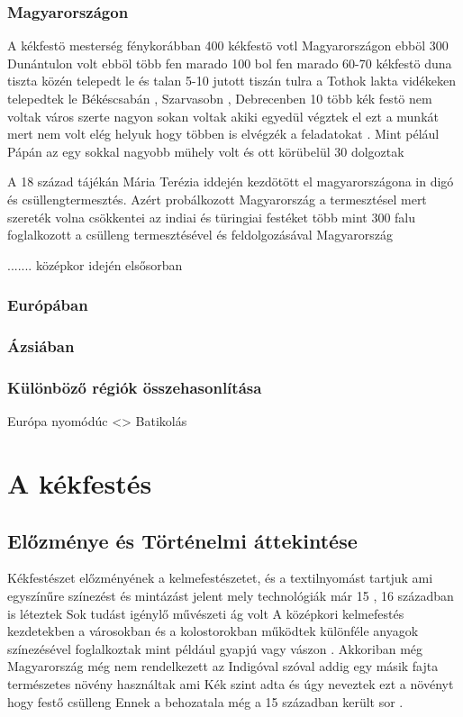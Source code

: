 \documentclass[fontsize=12pt, appendixprefix=true]{scrreprt}
\begin{document}
\subsection{Magyarországon}
A kékfestö mesterség fénykorábban 400 kékfestö votl Magyarországon ebböl 300 Dunántulon volt ebböl több fen marado 100 bol fen marado 60-70 kékfestö duna tiszta közén telepedt le és talan 5-10 jutott tiszán tulra a Tothok lakta vidékeken telepedtek  le Békéscsabán , Szarvasobn , Debrecenben 
10 több kék festö nem voltak város szerte 
nagyon sokan voltak akiki egyedül végztek el ezt a munkát mert nem volt elég helyuk hogy többen is elvégzék a feladatokat .
Mint pélául Pápán az egy sokkal nagyobb mühely volt és ott körübelül 30 dolgoztak 

A 18 század tájékán Mária Terézia iddején kezdötött el magyarországona in digó és csüllengtermesztés.
Azért probálkozott Magyarország a termesztésel mert szereték volna csökkentei az indiai és türingiai festéket
több mint 300 falu foglalkozott a csülleng termesztésével  és feldolgozásával 
Magyarország 
   
.......
középkor idején elsősorban 

\subsection{Európában}

\subsection{Ázsiában}

\subsection{Különböző régiók összehasonlítása}
   Európa nyomódúc <> Batikolás
\chapter{A kékfestés}
\section{Előzménye és Történelmi áttekintése}
Kékfestészet előzményének a kelmefestészetet, és a textilnyomást tartjuk ami egyszínűre színezést és mintázást jelent  mely technológiák már 15 , 16 században is léteztek 
Sok tudást igénylő művészeti ág volt
A középkori kelmefestés kezdetekben a városokban és a kolostorokban működtek különféle anyagok színezésével foglalkoztak mint például gyapjú vagy vászon . 
Akkoriban még Magyarország még nem rendelkezett az Indigóval szóval addig egy másik fajta természetes növény használtak ami  Kék szint adta és úgy neveztek ezt a növényt hogy festő csülleng 
 Ennek a behozatala még a 15 században került sor .
\end{document}
